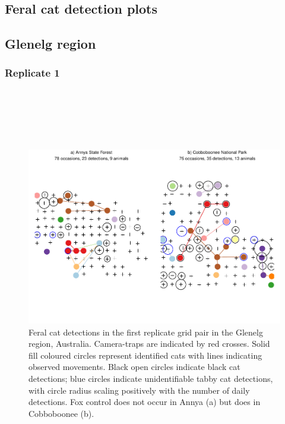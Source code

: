 \documentclass[11pt,a4paper,titlepage,twoside,openright]{style/unimelbthesis}
\begin{document}
\begin{mainmatter}
\newpage

\hypertarget{feral-cat-detection-plots}{%
\section{Feral cat detection plots}\label{feral-cat-detection-plots}}

\hypertarget{glenelg-region-3}{%
\subsection{Glenelg region}\label{glenelg-region-3}}

\hypertarget{replicate-1}{%
\subsubsection{Replicate 1}\label{replicate-1}}

\(~\)

\(~\)

\(~\)
\begin{figure}

{\centering \includegraphics[width=1\linewidth]{figure/density-plot-ch-1-1} 

}

\caption{Feral cat detections in the first replicate grid pair in the Glenelg region, Australia. Camera-traps are indicated by red crosses. Solid fill coloured circles represent identified cats with lines indicating observed movements. Black open circles indicate black cat detections; blue circles indicate unidentifiable tabby cat detections, with circle radius scaling positively with the number of daily detections. Fox control does not occur in Annya (a) but does in Cobboboonee (b).}\label{fig:density-plot-ch-1}
\end{figure}
\newpage


\end{mainmatter}
\end{document}
